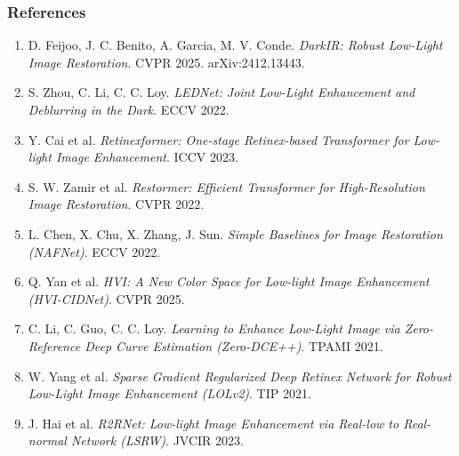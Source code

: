 \begin{frame}
    \frametitle{References}
    \scriptsize
    \begin{enumerate}
        \item D. Feijoo, J. C. Benito, A. Garcia, M. V. Conde. \emph{DarkIR: Robust Low-Light Image Restoration}. CVPR 2025. arXiv:2412.13443.
        \item S. Zhou, C. Li, C. C. Loy. \emph{LEDNet: Joint Low-Light Enhancement and Deblurring in the Dark}. ECCV 2022.
        \item Y. Cai et al. \emph{Retinexformer: One-stage Retinex-based Transformer for Low-light Image Enhancement}. ICCV 2023.
        \item S. W. Zamir et al. \emph{Restormer: Efficient Transformer for High-Resolution Image Restoration}. CVPR 2022.
        \item L. Chen, X. Chu, X. Zhang, J. Sun. \emph{Simple Baselines for Image Restoration (NAFNet)}. ECCV 2022.
        \item Q. Yan et al. \emph{HVI: A New Color Space for Low-light Image Enhancement (HVI-CIDNet)}. CVPR 2025.
        \item C. Li, C. Guo, C. C. Loy. \emph{Learning to Enhance Low-Light Image via Zero-Reference Deep Curve Estimation (Zero-DCE++)}. TPAMI 2021.
        \item W. Yang et al. \emph{Sparse Gradient Regularized Deep Retinex Network for Robust Low-Light Image Enhancement (LOLv2)}. TIP 2021.
        \item J. Hai et al. \emph{R2RNet: Low-light Image Enhancement via Real-low to Real-normal Network (LSRW)}. JVCIR 2023.
    \end{enumerate}
\end{frame}
